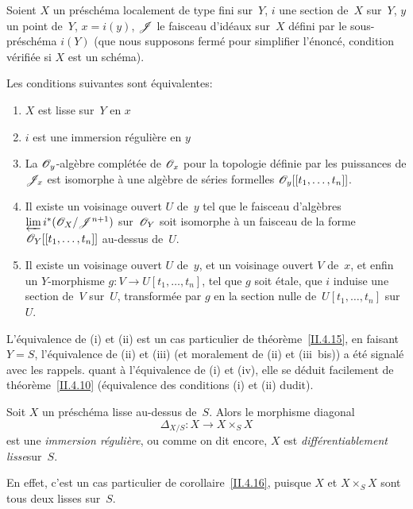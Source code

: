 \begin{corollaire}
\label{II.4.17}
Soient $X$ un pr\'esch\'ema localement de type fini sur~$Y$, $i$
une section de~$X$ sur~$Y$, $y$ un point de~$Y$, $x=i(y)$, $\cal{J}$
le faisceau d'id\'eaux sur~$X$ d\'efini par le
sous-pr\'esch\'ema $i(Y)$ (que nous supposons ferm\'e pour
simplifier l'\'enonc\'e, condition v\'erifi\'ee si $X$ est un
sch\'ema).

Les conditions suivantes sont \'equivalentes:
\begin{enumerate}
\item[(i)] $X$ est lisse sur~$Y$ en $x$
\item[(ii)] $i$ est une immersion r\'eguli\`ere en $y$
\item[(iii)] La $\cal{O}_y$-alg\`ebre compl\'et\'ee de
$\cal{O}_x$ pour la topologie d\'efinie par les puissances de
$\cal{J}_x$ est isomorphe \`a une alg\`ebre de s\'eries
formelles $\cal{O}_y[[ t_1,\dots,t_n]]$.
\item[(iii~bis)] Il existe un voisinage ouvert $U$ de~$y$ tel que le
faisceau d'alg\`ebres $\varprojlim i^*(\cal{O}_X/\cal{J}^{n+1})$ sur~$\cal{O}_Y$ soit isomorphe \`a un faisceau de la forme
$\cal{O}_Y[[ t_1,\dots, t_n]]$ au-dessus de~$U$.
\item[(iv)] Il existe un voisinage ouvert $U$ de~$y$, et un voisinage
ouvert $V$ de~$x$, et enfin un $Y$-morphisme $g \colon V \to
U[t_1,\dots, t_n]$, tel que $g$ soit \'etale, que
$i$
induise une section de~$V$ sur~$U$, transform\'ee par $g$ en la
section nulle de~$U[t_1,\dots, t_n]$ sur~$U$.
\end{enumerate}
\end{corollaire}

L'\'equivalence
de (i) et (ii) est un cas particulier de
th\'eor\`eme~\ref{II.4.15}, en faisant $Y=S$, l'\'equivalence de
(ii) et (iii) (et moralement de (ii) et (iii~bis)) a \'et\'e
signal\'e avec les \og rappels\fg. quant \`a l'\'equivalence de (i)
et (iv), elle se d\'eduit facilement de
th\'eor\`eme~\ref{II.4.10} (\'equivalence des conditions (i) et
(ii) dudit).

\begin{corollaire}
\label{II.4.18}
Soit $X$ un pr\'esch\'ema lisse au-dessus de~$S$. Alors le
morphisme diagonal
$$
\Delta_{X/S}\colon X\to X\times_S X
$$
est une
\emph{immersion régulière},
ou comme on dit encore, $X$ est \og \emph{différentiablement
lisse}\fg sur~$S$.
\end{corollaire}


En effet, c'est un cas particulier de corollaire~\ref{II.4.16}, puisque
$X$ et $X\times_S X$ sont tous deux lisses sur~$S$.

